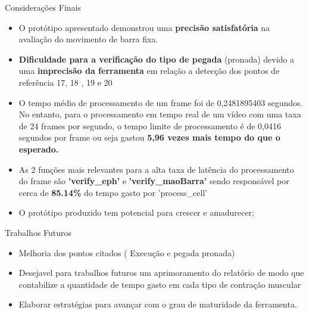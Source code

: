 \begin{frame}{Considerações Finais}
    \begin{itemize}
        \item O protótipo apresentado demonstrou uma \textbf{precisão satisfatória} na avaliação do movimento de barra fixa.
    
        \item \textbf{Dificuldade para a verificação do tipo de pegada} (pronada) devido a uma \textbf{imprecisão da ferramenta} em relação a detecção dos pontos de referência 17, 18 , 19 e 20
    
        \item O tempo médio de processamento de um frame foi de 0,2481895403 segundos. No entanto, para o processamento em tempo real de um vídeo com uma taxa de 24 frames por segundo, o tempo limite de processamento é de 0,0416 segundos por frame ou seja gastou\textbf{ 5,96 vezes mais tempo do que o esperado.}
    
        \item As 2 funções mais relevantes para a alta taxa de latência do processamento do frame são \textbf{’verify\_eph’} e \textbf{’verify\_maoBarra’} sendo responsável por cerca de \textbf{85.14\%} do tempo gasto por ’process\_cell’
    
        \item O protótipo produzido tem potencial para crescer e amadurecer;
    \end{itemize}
\end{frame}

\begin{frame}{Trabalhos Futuros}
    \begin{itemize}
        \item Melhoria dos pontos citados ( Execução e pegada pronada)
        \item Desejavel para trabalhos futuros um aprimoramento do relatório de modo que contabilize a quantidade de tempo gasto em cada tipo de contração muscular
        \item Elaborar estratégias para avançar com o grau de maturidade da ferramenta.
    \end{itemize}
\end{frame}
